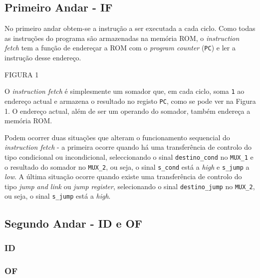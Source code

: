 \documentclass[11pt]{article}
\numberwithin{equation}{section}
\begin{document}
\subsection{Primeiro Andar - IF}

No primeiro andar obtem-se a instrução a ser executada a cada ciclo. Como todas as instruções do programa são armazenadas na memória ROM, o \textit{instruction fetch} tem a função de endereçar a ROM com o \textit{program counter} (\texttt{PC}) e ler a instrução desse endereço.

FIGURA 1

O \textit{instruction fetch} é simplesmente um somador que, em cada ciclo, soma \texttt{1} ao endereço actual e armazena o resultado no registo \texttt{PC}, como se pode ver na Figura 1. O endereço actual, além de ser um operando do somador, também endereça a memória ROM.

Podem ocorrer duas situações que alteram o funcionamento sequencial do \textit{instruction fetch} - a primeira ocorre quando há uma transferência de controlo do tipo condicional ou incondicional, seleccionando o sinal \texttt{destino\_cond} no \texttt{MUX\_1} e o resultado do somador no \texttt{MUX\_2}, ou seja, o sinal \texttt{s\_cond} está a \textit{high} e \texttt{s\_jump} a \textit{low}. A última situação ocorre quando existe uma transferência de controlo do tipo \textit{jump and link} ou \textit{jump register}, selecionando o sinal \texttt{destino\_jump} no \texttt{MUX\_2}, ou seja, o sinal \texttt{s\_jump} está a \textit{high}.



\subsection{Segundo Andar - ID e OF}

\subsubsection{ID}



\subsubsection{OF}
\end{document}
